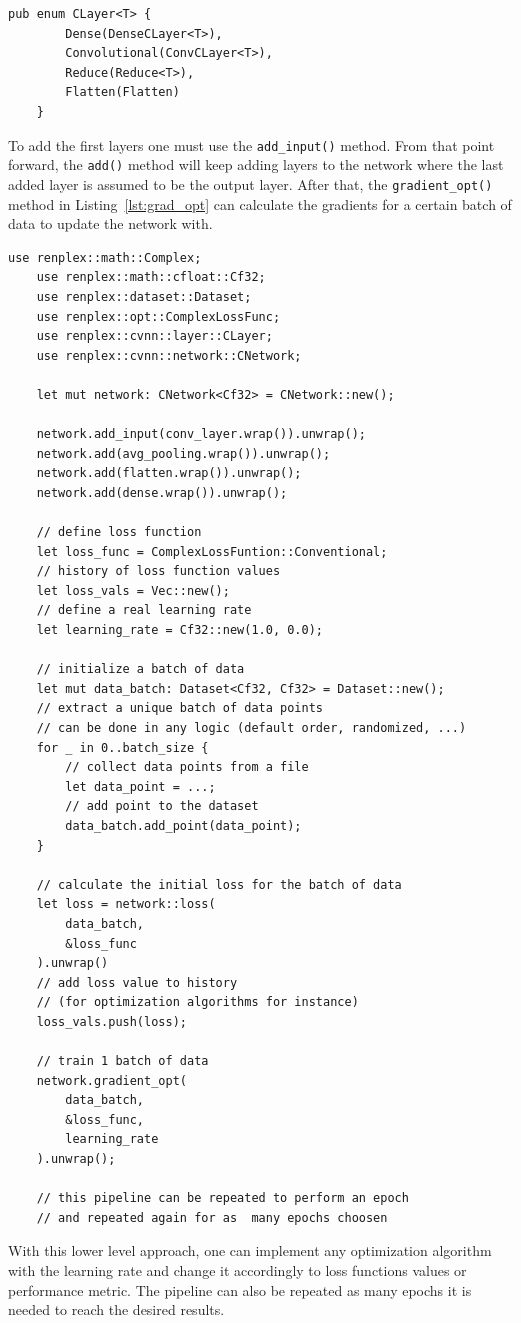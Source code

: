 \begin{lstlisting}[label=lst:enumlayer,caption=Enumeration of the general layer interface.]
	pub enum CLayer<T> {
		Dense(DenseCLayer<T>),
		Convolutional(ConvCLayer<T>),
		Reduce(Reduce<T>),
		Flatten(Flatten)
	}
\end{lstlisting}

To add the first layers one must use the \texttt{add\_input()} method. From that point forward, the \texttt{add()} method will keep adding layers to the network where the last added layer is assumed to be the output layer. After that, the \texttt{gradient\_opt()} method in Listing~\ref{lst:grad_opt} can calculate the gradients for a certain batch of data to update the network with.

\begin{lstlisting}[caption=A short example on how to build a batch of data and train it in a previously constructed network.]
	use renplex::math::Complex;
	use renplex::math::cfloat::Cf32;
	use renplex::dataset::Dataset;
	use renplex::opt::ComplexLossFunc;	
	use renplex::cvnn::layer::CLayer;
	use renplex::cvnn::network::CNetwork;
	
	let mut network: CNetwork<Cf32> = CNetwork::new();
	
	network.add_input(conv_layer.wrap()).unwrap();
	network.add(avg_pooling.wrap()).unwrap();
	network.add(flatten.wrap()).unwrap();
	network.add(dense.wrap()).unwrap();
	
	// define loss function
	let loss_func = ComplexLossFuntion::Conventional;
	// history of loss function values
	let loss_vals = Vec::new();
	// define a real learning rate
	let learning_rate = Cf32::new(1.0, 0.0);
	
	// initialize a batch of data
	let mut data_batch: Dataset<Cf32, Cf32> = Dataset::new();
	// extract a unique batch of data points
	// can be done in any logic (default order, randomized, ...)
	for _ in 0..batch_size {
		// collect data points from a file
		let data_point = ...;
		// add point to the dataset
		data_batch.add_point(data_point);
	}
	
	// calculate the initial loss for the batch of data
	let loss = network::loss(
		data_batch,
		&loss_func
	).unwrap()
	// add loss value to history
	// (for optimization algorithms for instance)
	loss_vals.push(loss);
	
	// train 1 batch of data
	network.gradient_opt(
		data_batch,
		&loss_func,
		learning_rate
	).unwrap();
	
	// this pipeline can be repeated to perform an epoch
	// and repeated again for as  many epochs choosen
\end{lstlisting}

With this lower level approach, one can implement any optimization algorithm with the learning rate and change it accordingly to loss functions values or performance metric. The pipeline can also be repeated as many epochs it is needed to reach the desired results.